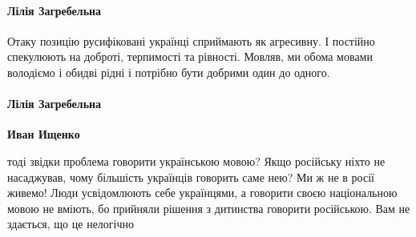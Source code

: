 \paragraph{Лілія Загребельна}

Отаку позицію русифіковані українці сприймають як агресивну. І постійно
спекулюють на доброті, терпимості та рівності. Мовляв, ми обома мовами
володіємо і обидві рідні і потрібно бути добрими один до одного. 

\paragraph{Лілія Загребельна}

\textbf{Иван Ищенко}

тоді звідки проблема говорити українською мовою? Якщо російську ніхто не
насаджував, чому більшість українців говорить саме нею? Ми ж не в росії живемо!
Люди усвідомлюють себе українцями, а говорити своєю національною мовою не
вміють, бо прийняли рішення з дитинства говорити російською. Вам не здається,
що це нелогічно
